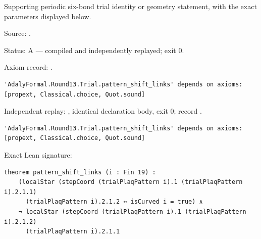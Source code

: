 \begin{theorem}[bp-407]
\label{bp-407}
\leanok
Supporting periodic six-bond trial identity or geometry statement, with the exact parameters displayed below.

\par Source: \texttt{}.
\par Status: A — compiled and independently replayed; exit 0.
\par Axiom record: \texttt{}.
\begin{verbatim}
'AdalyFormal.Round13.Trial.pattern_shift_links' depends on axioms: [propext, Classical.choice, Quot.sound]
\end{verbatim}
\par Independent replay: \texttt{}, identical declaration body, exit 0; record \texttt{}.
\begin{verbatim}
'AdalyFormal.Round13.Trial.pattern_shift_links' depends on axioms: [propext, Classical.choice, Quot.sound]
\end{verbatim}
\par Exact Lean signature:
\begin{verbatim}
theorem pattern_shift_links (i : Fin 19) :
    (localStar (stepCoord (trialPlaqPattern i).1 (trialPlaqPattern i).2.1.1)
      (trialPlaqPattern i).2.1.2 ↔ isCurved i = true) ∧
    ¬ localStar (stepCoord (trialPlaqPattern i).1 (trialPlaqPattern i).2.1.2)
      (trialPlaqPattern i).2.1.1
\end{verbatim}
\end{theorem}

